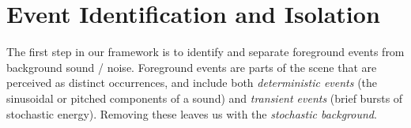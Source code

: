 \documentclass[review]{acmsiggraph}      %
\begin{document}
\section{Event Identification and Isolation}

The first step in our framework is to identify and separate foreground events from 
background sound / noise. Foreground events are parts of the scene that are perceived as distinct occurrences, and include both \emph{deterministic events} (the 
sinusoidal or pitched components of a sound) and \emph{transient events} (brief bursts 
of stochastic energy). Removing these leaves us with the \emph{stochastic background}. 


%
%
%
%
\end{document}

